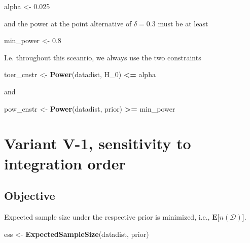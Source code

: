 \documentclass[]{book}
\newenvironment{Shaded}{\begin{snugshade}}{\end{snugshade}}
\newcommand{\DecValTok}[1]{\textcolor[rgb]{0.00,0.00,0.81}{#1}}
\newcommand{\FloatTok}[1]{\textcolor[rgb]{0.00,0.00,0.81}{#1}}
\newcommand{\KeywordTok}[1]{\textcolor[rgb]{0.13,0.29,0.53}{\textbf{#1}}}
\newcommand{\NormalTok}[1]{#1}
\newcommand{\OperatorTok}[1]{\textcolor[rgb]{0.81,0.36,0.00}{\textbf{#1}}}
\newcommand{\StringTok}[1]{\textcolor[rgb]{0.31,0.60,0.02}{#1}}
\begin{document}
\begin{Shaded}
\begin{Highlighting}[]
\NormalTok{alpha <-}\StringTok{ }\FloatTok{0.025}
\end{Highlighting}
\end{Shaded}

and the power at the point alternative of \(\delta=0.3\) must
be at least

\begin{Shaded}
\begin{Highlighting}[]
\NormalTok{min_power <-}\StringTok{ }\FloatTok{0.8}
\end{Highlighting}
\end{Shaded}

I.e. throughout this sceanrio, we always use the two
constraints

\begin{Shaded}
\begin{Highlighting}[]
\NormalTok{toer_cnstr <-}\StringTok{ }\KeywordTok{Power}\NormalTok{(datadist, H_}\DecValTok{0}\NormalTok{) }\OperatorTok{<=}\StringTok{ }\NormalTok{alpha}
\end{Highlighting}
\end{Shaded}

and

\begin{Shaded}
\begin{Highlighting}[]
\NormalTok{pow_cnstr <-}\StringTok{ }\KeywordTok{Power}\NormalTok{(datadist, prior) }\OperatorTok{>=}\StringTok{ }\NormalTok{min_power}
\end{Highlighting}
\end{Shaded}

\hypertarget{variantV_1}{%
\section{Variant V-1, sensitivity to integration order}\label{variantV_1}}

\hypertarget{objective-10}{%
\subsection{Objective}\label{objective-10}}

Expected sample size under the respective prior is minimized, i.e.,
\(\boldsymbol{E}\big[n(\mathcal{D})\big]\).

\begin{Shaded}
\begin{Highlighting}[]
\NormalTok{ess <-}\StringTok{ }\KeywordTok{ExpectedSampleSize}\NormalTok{(datadist, prior)}
\end{Highlighting}
\end{Shaded}
\end{document}
